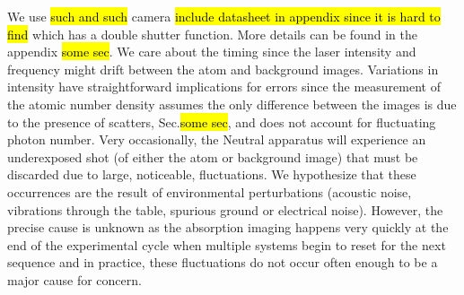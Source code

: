 We use \hl{such and such} camera \hl{include datasheet in appendix since it is hard to find} which has a double shutter function. More details can be found in the appendix \hl{some sec}. We care about the timing since the laser intensity and frequency might drift between the atom and background images. Variations in intensity have straightforward implications for errors since the measurement of the atomic number density assumes the only difference between the images is due to the presence of scatters, Sec.\hl{some sec}, and does not account for fluctuating photon number. Very occasionally, the Neutral apparatus will experience an underexposed shot (of either the atom or background image) that must be discarded due to large, noticeable, fluctuations. We hypothesize that these occurrences are the result of environmental perturbations (acoustic noise, vibrations through the table, spurious ground or electrical noise). However, the precise cause is unknown as the absorption imaging happens very quickly at the end of the experimental cycle when multiple systems begin to reset for the next sequence and in practice, these fluctuations do not occur often enough to be a major cause for concern.


